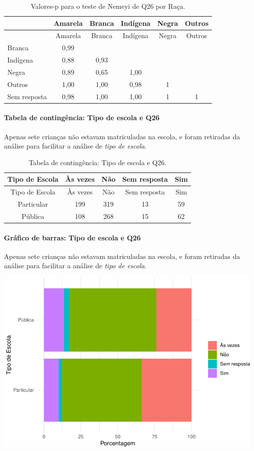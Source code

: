 \documentclass[]{article}
\let\oldparagraph\paragraph
\renewcommand{\paragraph}[1]{\oldparagraph{#1}\mbox{}}
\begin{document}
\begin{longtable}[]{@{}lccccc@{}}
\caption{\label{tab:unnamed-chunk-759}Valores-p para o teste de Nemeyi de Q26 por Raça.}\tabularnewline
\toprule
& Amarela & Branca & Indígena & Negra & Outros\tabularnewline
\midrule
\endfirsthead
\toprule
& Amarela & Branca & Indígena & Negra & Outros\tabularnewline
\midrule
\endhead
Branca & 0,99 & & & &\tabularnewline
Indígena & 0,88 & 0,93 & & &\tabularnewline
Negra & 0,89 & 0,65 & 1,00 & &\tabularnewline
Outros & 1,00 & 1,00 & 0,98 & 1 &\tabularnewline
Sem resposta & 0,98 & 1,00 & 1,00 & 1 & 1\tabularnewline
\bottomrule
\end{longtable}

\cleardoublepage

\hypertarget{tabela-de-continguxeancia-tipo-de-escola-e-q26}{%
\paragraph{Tabela de contingência: Tipo de escola e Q26}\label{tabela-de-continguxeancia-tipo-de-escola-e-q26}}

Apenas sete crianças não estavam matriculadas na escola, e foram retiradas da análise para facilitar a análise de \emph{tipo de escola}.

\begin{longtable}[]{@{}ccccc@{}}
\caption{\label{tab:unnamed-chunk-760}Tabela de contingência: Tipo de escola e Q26.}\tabularnewline
\toprule
Tipo de Escola & Às vezes & Não & Sem resposta & Sim\tabularnewline
\midrule
\endfirsthead
\toprule
Tipo de Escola & Às vezes & Não & Sem resposta & Sim\tabularnewline
\midrule
\endhead
Particular & 199 & 319 & 13 & 59\tabularnewline
Pública & 108 & 268 & 15 & 62\tabularnewline
\bottomrule
\end{longtable}

\hypertarget{gruxe1fico-de-barras-tipo-de-escola-e-q26}{%
\paragraph{Gráfico de barras: Tipo de escola e Q26}\label{gruxe1fico-de-barras-tipo-de-escola-e-q26}}

Apenas sete crianças não estavam matriculadas na escola, e foram retiradas da análise para facilitar a análise de \emph{tipo de escola}.

\begin{center}\includegraphics[width=0.75\linewidth]{relatorio_covid19_files/figure-latex/unnamed-chunk-761-1} \end{center}
\end{document}
